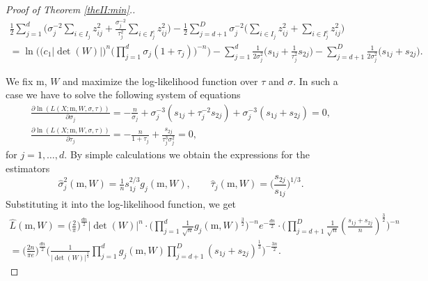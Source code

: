 \documentclass[12pt]{article}
\def\m{\mathrm{m}}
\theoremstyle{definition}
\begin{document}
\begin{proof}[Proof of Theorem \ref{theII:min}.]
$$\begin{array}{l}
  \frac{1}{2} \sum\limits_{j=1}^{d} \Big( \sigma_j^{-2} \sum\limits_{i \in I_{j}}    z_{ij}^2   + \frac{\sigma_j^{-2}}{\tau_{j}^{2} }  \sum\limits_{i \in I_{j}^{c}}   z_{ij}^2  \Big) - \frac{1}{2} \sum\limits_{j=d+1}^{D} \sigma_j^{-2} \Big( \sum\limits_{i \in I_{j}}    z_{ij}^2   +  \sum\limits_{i \in I_{j}^{c}}   z_{ij}^2  \Big) \\[6pt]
= \ln \bigg( \Big( c_1|\det(W)| \Big)^{n} \Big( \prod\limits_{j=1}^{d} \sigma_j(1+\tau_j) \Big)^{-n} \bigg)  - 
 \sum\limits_{j=1}^{d} \frac{1}{2\sigma_j^{2}} \Big(  s_{1j}  + \frac{1}{\tau_{j}^{2} }  s_{2j}  \Big) - \sum\limits_{j=d+1}^{D} \frac{1}{2\sigma_j^{2}} \Big(  s_{1j}  + s_{2j}  \Big).
\end{array}
$$

We fix  $\m$, $W$ and maximize the log-likelihood function over $\tau$ and $\sigma$.
In such a case we have to solve the following system of equations
$$
\begin{array}{l}
\frac{\partial  \ln ( L(X;\m,W,\sigma,\tau) ) }{\partial \sigma_j} = -\frac{n}{\sigma_j} +  \sigma_j^{-3} (s_{1j} + \tau_j^{-2} s_{2j} ) +  \sigma_j^{-3} (s_{1j} + s_{2j} )
 =0, \\[6pt] %
 \frac{\partial  \ln ( L(X;\m,W,\sigma,\tau) ) }{\partial \tau_j} = - \frac{n}{1+\tau_j} + \frac{s_{2j}}{\tau_j^{3}\sigma_j^{2}} =0 , %
\end{array}
$$
for  $ j=1,\ldots,d$.
By simple calculations we obtain the expressions for the estimators
$$
\hat{\sigma}_j^2(\m,W) = 
\tfrac{1}{n} s_{1j}^{2/3} g_{j}(\m,W), \qquad
\hat{\tau}_{j}(\m,W) = \bigg( \frac{s_{2j}}{s_{1j}} \bigg)^{1/3}.
$$
Substituting it into the log-likelihood function,
we get
$$
\begin{array}{l}
\hat{L}(\m,W) = \bigg( \frac{2}{\pi} \bigg)^{\frac{dn}{2}}  |\det(W)|^{n} \cdot \Big( \prod\limits_{j=1}^{d} \frac{1}{\sqrt{n}} g_j(\m,W)^{\frac{3}{2}} \Big)^{-n}  e^{-\frac{dn}{2}} \cdot \Big( \prod\limits_{j=d+1}^{D} \frac{1}{\sqrt{n}} (\frac{s_{1j} + s_{2j}}{n})^{\frac{3}{2}} \Big)^{-n}\\[6pt]
= \bigg( \frac{2n}{\pi e} \bigg)^{\frac{dn}{2}}  \Big( \frac{1}{|\det(W)|^{\frac{2}{3}}} \prod\limits_{j=1}^{d} g_j(\m,W) \prod\limits_{j=d+1}^{D} (s_{1j} + s_{2j})^{\frac{1}{3}} \Big)^{-\frac{3n}{2}}. 
\end{array}
$$
\end{proof}
\end{document}
